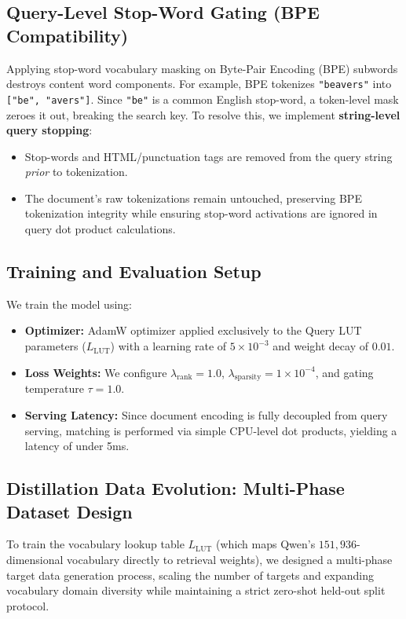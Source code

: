 \documentclass[11pt,a4paper]{article}
\begin{document}
\subsection{Query-Level Stop-Word Gating (BPE Compatibility)}
Applying stop-word vocabulary masking on Byte-Pair Encoding (BPE) subwords destroys content word components. For example, BPE tokenizes \texttt{"beavers"} into \texttt{["be", "avers"]}. Since \texttt{"be"} is a common English stop-word, a token-level mask zeroes it out, breaking the search key.
To resolve this, we implement \textbf{string-level query stopping}:
\begin{itemize}
    \item Stop-words and HTML/punctuation tags are removed from the query string \textit{prior} to tokenization.
    \item The document's raw tokenizations remain untouched, preserving BPE tokenization integrity while ensuring stop-word activations are ignored in query dot product calculations.
\end{itemize}

\subsection{Training and Evaluation Setup}
We train the model using:
\begin{itemize}
    \item \textbf{Optimizer:} AdamW optimizer applied exclusively to the Query LUT parameters ($L_{\text{LUT}}$) with a learning rate of $5 \times 10^{-3}$ and weight decay of $0.01$.
    \item \textbf{Loss Weights:} We configure $\lambda_{\text{rank}} = 1.0$, $\lambda_{\text{sparsity}} = 1 \times 10^{-4}$, and gating temperature $\tau = 1.0$.
    \item \textbf{Serving Latency:} Since document encoding is fully decoupled from query serving, matching is performed via simple CPU-level dot products, yielding a latency of under 5ms.
\end{itemize}

\subsection{Distillation Data Evolution: Multi-Phase Dataset Design}
To train the vocabulary lookup table $L_{\text{LUT}}$ (which maps Qwen's $151,936$-dimensional vocabulary directly to retrieval weights), we designed a multi-phase target data generation process, scaling the number of targets and expanding vocabulary domain diversity while maintaining a strict zero-shot held-out split protocol.
\end{document}
